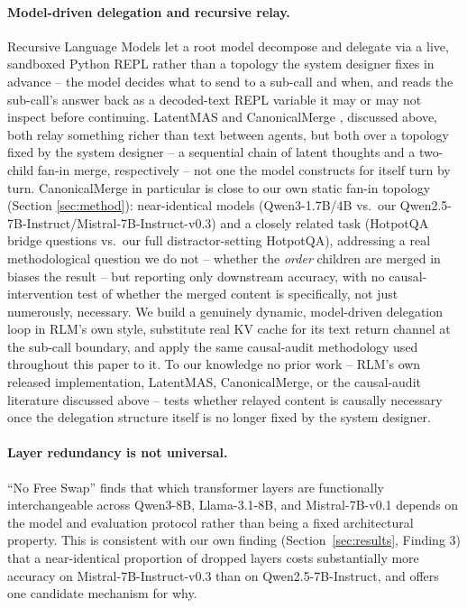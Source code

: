 \documentclass[11pt]{article}
\begin{document}
\paragraph{Model-driven delegation and recursive relay.} Recursive
Language Models \citep{rlm2026} let a root model decompose and delegate
via a live, sandboxed Python REPL rather than a topology the system
designer fixes in advance -- the model decides what to send to a sub-call
and when, and reads the sub-call's answer back as a decoded-text REPL
variable it may or may not inspect before continuing. LatentMAS
\citep{latentmas2026} and CanonicalMerge \citep{canonicalmerge2026},
discussed above, both relay something richer than text between agents,
but both over a topology fixed by the system designer -- a sequential
chain of latent thoughts and a two-child fan-in merge, respectively --
not one the model constructs for itself turn by turn. CanonicalMerge in
particular is close to our own static fan-in topology (Section
\ref{sec:method}): near-identical models (Qwen3-1.7B/4B vs.\ our
Qwen2.5-7B-Instruct/Mistral-7B-Instruct-v0.3) and a closely related task
(HotpotQA bridge questions vs.\ our full distractor-setting HotpotQA),
addressing a real methodological question we do not -- whether the
\emph{order} children are merged in biases the result -- but reporting
only downstream accuracy, with no causal-intervention test of whether
the merged content is specifically, not just numerously, necessary. We
build a genuinely dynamic, model-driven delegation loop in RLM's own
style, substitute real KV cache for its text return channel at the
sub-call boundary, and apply the same causal-audit methodology used
throughout this paper to it. To our knowledge no prior work -- RLM's own
released implementation, LatentMAS, CanonicalMerge, or the causal-audit
literature discussed above -- tests whether relayed content is causally
necessary once the delegation structure itself is no longer fixed by the
system designer.

\paragraph{Layer redundancy is not universal.} ``No Free Swap''
\citep{nofreeswap2026} finds that which transformer layers are
functionally interchangeable across Qwen3-8B, Llama-3.1-8B, and
Mistral-7B-v0.1 depends on the model and evaluation protocol rather than
being a fixed architectural property. This is consistent with our own
finding (Section~\ref{sec:results}, Finding 3) that a near-identical
proportion of dropped layers costs substantially more accuracy on
Mistral-7B-Instruct-v0.3 than on Qwen2.5-7B-Instruct, and offers one
candidate mechanism for why.
\end{document}

